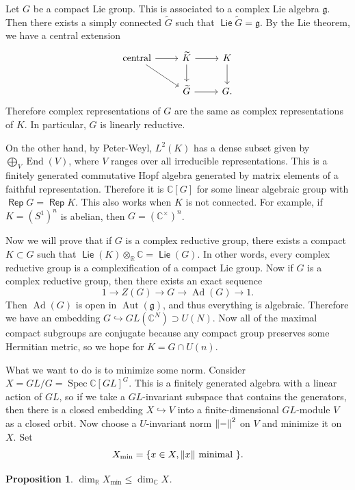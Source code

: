 \documentclass[leqno, openany]{memoir}
\newtheorem{prop}[thm]{Proposition}
\theoremstyle{definition}
\theoremstyle{remark}
\theoremstyle{plain}
\theoremstyle{definition}
\theoremstyle{remark}
\newcommand{\R}{\mathbb{R}}
\newcommand{\C}{\mathbb{C}}
\newcommand{\mf}[1]{\mathfrak{#1}}
\newcommand{\wtl}[1]{\widetilde{#1}}
\DeclareMathOperator{\End}{End}
\DeclareMathOperator{\Ad}{Ad}
\DeclareMathOperator{\Aut}{Aut}
\DeclareMathOperator{\Spec}{Spec}
\DeclareMathOperator{\Lie}{\mathsf{Lie}}
\DeclareMathOperator{\Rep}{\mathsf{Rep}}
\begin{document}
Let $G$ be a compact Lie group. This is associated to a complex Lie algebra $\mf{g}$. Then there exists a simply connected $\wtl{G}$ such that $\Lie \wtl{G} = \mf{g}$. By the Lie theorem, we have a central extension
\begin{equation*}
\begin{tikzcd}
    \text{central} \ar{r} \ar{dr} & \wtl{K} \ar{r} \ar{d} & K \ar{d} \\
                                  & \wtl{G} \ar{r} & G.
\end{tikzcd}
\end{equation*}
Therefore complex representations of $G$ are the same as complex representations of $K$. In particular, $G$ is linearly reductive.

On the other hand, by Peter-Weyl, $L^2(K)$ has a dense subset given by $\bigoplus_{V} \End(V)$, where $V$ ranges over all irreducible representations. This is a finitely generated commutative Hopf algebra generated by matrix elements of a faithful representation. Therefore it is $\C[G]$ for some linear algebraic group with $\Rep G = \Rep K$. This also works when $K$ is not connected. For example, if $K = {(S^1)}^n$ is abelian, then $G = {(\C^{\times})}^n$.

Now we will prove that if $G$ is a complex reductive group, there exists a compact $K \subset G$ such that $\Lie(K) \otimes_{\R} \C = \Lie(G)$. In other words, every complex reductive group is a complexification of a compact Lie group. Now if $G$ is a complex reductive group, then there exists an exact sequence
\[ 1 \to Z(G) \to G \to \Ad(G) \to 1. \]
Then $\Ad(G)$ is open in $\Aut(\mf{g})$, and thus everything is algebraic. Therefore we have an embedding $G \hookrightarrow GL(\C^N) \supset U(N)$. Now all of the maximal compact subgroups are conjugate because any compact group preserves some Hermitian metric, so we hope for $K = G \cap U(n)$.

What we want to do is to minimize some norm. Consider $X = GL/G = {\Spec \C[GL]}^G$. This is a finitely generated algebra with a linear action of $GL$, so if we take a $GL$-invariant subspace that contains the generators, then there is a closed embedding $X \hookrightarrow V$ into a finite-dimensional $GL$-module $V$ as a closed orbit. Now choose a $U$-invariant norm $\norm{-}^2$ on $V$ and minimize it on $X$. Set
\[ X_{\min} = \qty{x \in X, \norm{x} \text{ minimal }}. \]
\begin{prop}
    $\dim_{\R} X_{\min} \leq \dim_{\C} X$.
\end{prop}
\end{document}
